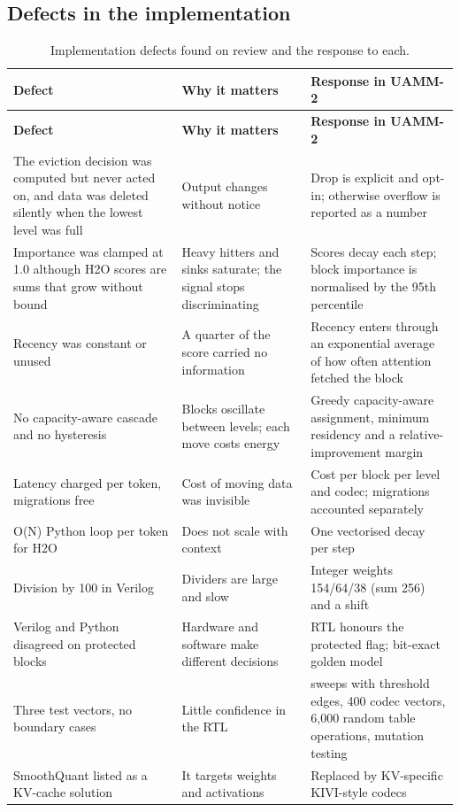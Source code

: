 \documentclass[12pt,a4paper]{report}
\begin{document}
\subsection{Defects in the implementation}\label{sec:4_2}
{\fontsize{8}{9.5}\selectfont\setlength{\tabcolsep}{3pt}
\begin{longtable}{>{\raggedright\arraybackslash}p{2.05in}>{\raggedright\arraybackslash}p{1.69in}>{\raggedright\arraybackslash}p{2.23in}}
\caption{Implementation defects found on review and the response to each.}\\
\toprule
\textbf{Defect} & \textbf{Why it matters} & \textbf{Response in UAMM-2} \\\midrule\endfirsthead
\toprule \textbf{Defect} & \textbf{Why it matters} & \textbf{Response in UAMM-2} \\\midrule\endhead
\bottomrule\endfoot
The eviction decision was computed but never acted on, and data was deleted silently when the lowest level was full & Output changes without notice & Drop is explicit and opt-in; otherwise overflow is reported as a number \\
Importance was clamped at 1.0 although H2O scores are sums that grow without bound & Heavy hitters and sinks saturate; the signal stops discriminating & Scores decay each step; block importance is normalised by the 95th percentile \\
Recency was constant or unused & A quarter of the score carried no information & Recency enters through an exponential average of how often attention fetched the block \\
No capacity-aware cascade and no hysteresis & Blocks oscillate between levels; each move costs energy & Greedy capacity-aware assignment, minimum residency and a relative-improvement margin \\
Latency charged per token, migrations free & Cost of moving data was invisible & Cost per block per level and codec; migrations accounted separately \\
O(N) Python loop per token for H2O & Does not scale with context & One vectorised decay per step \\
Division by 100 in Verilog & Dividers are large and slow & Integer weights 154/64/38 (sum 256) and a shift \\
Verilog and Python disagreed on protected blocks & Hardware and software make different decisions & RTL honours the protected flag; bit-exact golden model \\
Three test vectors, no boundary cases & Little confidence in the RTL & 17 sweeps with threshold edges, 400 codec vectors, 6,000 random table operations, mutation testing \\
SmoothQuant listed as a KV-cache solution & It targets weights and activations & Replaced by KV-specific KIVI-style codecs \\
\bottomrule
\end{longtable}}
\end{document}
